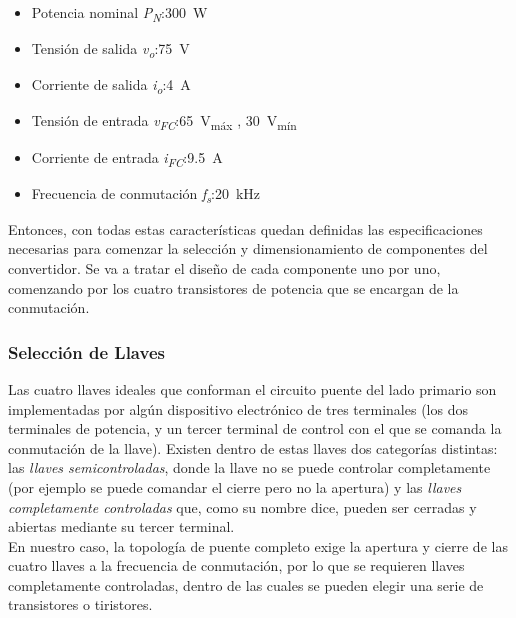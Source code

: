 \begin{itemize}
    \item {\SemiBold Potencia nominal \textit{P\textsubscript{N}}:}\quad\SI[]{300}[]{\watt}
    \item {\SemiBold Tensión de salida \textit{v\textsubscript{o}}:}\quad\SI[]{75}[]{\volt}
    \item {\SemiBold Corriente de salida \textit{i\textsubscript{o}}:}\quad\SI[]{4}[]{\ampere}
    \item {\SemiBold Tensión de entrada \textit{v\textsubscript{FC}}:}\quad\SI[]{65}[]{\volt}\textsubscript{máx} , \SI[]{30}[]{\volt}\textsubscript{mín}
    \item {\SemiBold Corriente de entrada \textit{i\textsubscript{FC}}:}\quad\SI[]{9.5}[]{\ampere}
    \item {\SemiBold Frecuencia de conmutación \textit{f\textsubscript{s}}:}\quad\SI[]{20}[]{\kilo\hertz}\\
\end{itemize}

Entonces, con todas estas características quedan definidas las especificaciones necesarias para comenzar la selección y dimensionamiento de componentes del convertidor. Se va a tratar el diseño de cada componente uno por uno, comenzando por los cuatro transistores de potencia que se encargan de la conmutación.\\

\subsubsection{Selección de Llaves}

Las cuatro llaves ideales que conforman el circuito puente del lado primario son implementadas por algún dispositivo electrónico de tres terminales (los dos terminales de potencia, y un tercer terminal de control con el que se comanda la conmutación de la llave). Existen dentro de estas llaves dos categorías distintas: las \textit{llaves semicontroladas}, donde la llave no se puede controlar completamente (por ejemplo se puede comandar el cierre pero no la apertura) y las \textit{llaves completamente controladas} que, como su nombre dice, pueden ser cerradas y abiertas mediante su tercer terminal.\\

En nuestro caso, la topología de puente completo exige la apertura y cierre de las cuatro llaves a la frecuencia de conmutación, por lo que se requieren {\Medium llaves completamente controladas}, dentro de las cuales se pueden elegir una serie de transistores o tiristores.\\

